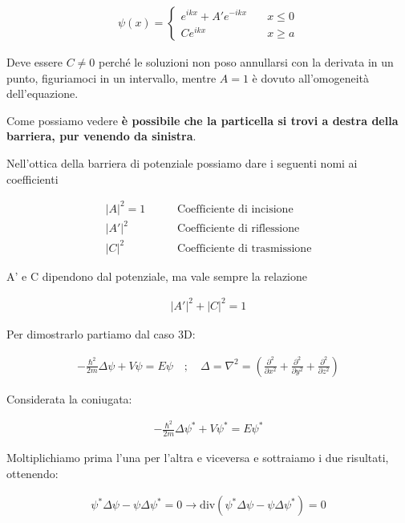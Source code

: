 \begin{align}
\psi(x)=\left\{
\begin{array}{cc}
e^{ikx} + A'e^{-ikx} 	\quad {}&x\leq 0\\
Ce^{ikx}  \qquad \quad \; \; 	\quad &x\geq a
\end{array}
\right.
\end{align}


Deve essere $C\neq 0$ perché le soluzioni non poso annullarsi con la derivata in un punto, figuriamoci in un intervallo, mentre $A=1$ è dovuto all'omogeneità dell'equazione.

Come possiamo vedere \textbf{è possibile che la particella si trovi a destra della barriera, pur venendo da sinistra}.

Nell'ottica della barriera di potenziale possiamo dare i seguenti nomi ai coefficienti

\begin{align}
|A|^2=1 \qquad {}&\text{Coefficiente di incisione} \\
|A'|^2 \qquad \quad \;\; &\text{Coefficiente di riflessione} \\
|C|^2  \qquad \quad \;\;\, &\text{Coefficiente di trasmissione}
\end{align}

A' e C dipendono dal potenziale, ma vale sempre la relazione 

\begin{align}
|A'|^2+|C|^2=1
\end{align}

Per dimostrarlo partiamo dal caso 3D:

\begin{align}
-\frac{\hbar^2}{2m}\Delta \psi + V \psi= E \psi \quad;\quad \Delta = \nabla^2= \left(
\frac{\partial^2}{\partial x^2} + \frac{\partial^2}{\partial y^2} + \frac{\partial^2}{\partial z^2}
\right)
\end{align}

Considerata la coniugata:


\begin{align}
-\frac{\hbar^2}{2m}\Delta \psi^* + V \psi^*= E \psi^*
\end{align}

Moltiplichiamo prima l'una per l'altra e viceversa e sottraiamo i due risultati, ottenendo:

\begin{align}
\psi^*\Delta \psi - \psi \Delta \psi^*=0 \rightarrow \text{div}(\psi^*\Delta \psi - \psi \Delta \psi^*)=0
\end{align}

